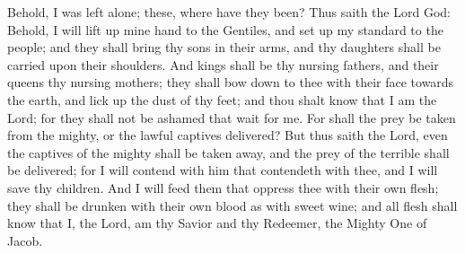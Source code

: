 Behold, I was left alone; these, where have they been?
\bverse \iffalse Thus saith the Lord God: Behold, I will lift up mine hand to the Gentiles, and set up my standard to the people; and they shall bring thy sons in their arms, and thy daughters shall be carried upon their shoulders. \fi
Thus saith the Lord God: Behold, I will lift up mine hand to the Gentiles, and set up my standard to the people; and they shall bring thy sons in their arms, and thy daughters shall be carried upon their shoulders.
\bverse \iffalse And kings shall be thy nursing fathers, and their queens thy nursing mothers; they shall bow down to thee with their face towards the earth, and lick up the dust of thy feet; and thou shalt know that I am the Lord; for they shall not be ashamed that wait for me. \fi
And kings shall be thy nursing fathers, and their queens thy nursing mothers; they shall bow down to thee with their face towards the earth, and lick up the dust of thy feet; and thou shalt know that I am the Lord; for they shall not be ashamed that wait for me.
\bverse \iffalse For shall the prey be taken from the mighty, or the lawful captives delivered? \fi
For shall the prey be taken from the mighty, or the lawful captives delivered?
\bverse \iffalse But thus saith the Lord, even the captives of the mighty shall be taken away, and the prey of the terrible shall be delivered; for I will contend with him that contendeth with thee, and I will save thy children. \fi
But thus saith the Lord, even the captives of the mighty shall be taken away, and the prey of the terrible shall be delivered; for I will contend with him that contendeth with thee, and I will save thy children.
\bverse \iffalse And I will feed them that oppress thee with their own flesh; they shall be drunken with their own blood as with sweet wine; and all flesh shall know that I, the Lord, am thy Savior and thy Redeemer, the Mighty One of Jacob. \fi
And I will feed them that oppress thee with their own flesh; they shall be drunken with their own blood as with sweet wine; and all flesh shall know that I, the Lord, am thy Savior and thy Redeemer, the Mighty One of Jacob.

